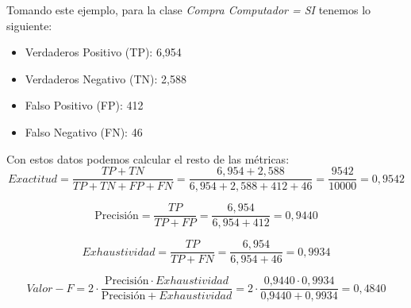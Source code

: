 Tomando este ejemplo, para la clase \textit{Compra Computador = SI} tenemos lo siguiente:

\begin{itemize}
	\item Verdaderos Positivo (TP): 6,954
	\item Verdaderos Negativo (TN): 2,588
	\item Falso Positivo (FP): 412
	\item Falso Negativo (FN): 46
\end{itemize}

Con estos datos podemos calcular el resto de las métricas:
\begin{equation*}
Exactitud = \frac{TP + TN}{TP + TN + FP + FN} = \frac{6,954 + 2,588}{6,954 + 2,588 + 412 + 46} = \frac{9542}{10000} = 0,9542
\end{equation*}

\begin{equation*}
\mbox{Precisión} = \frac{TP}{TP + FP} = \frac{6,954}{6,954 + 412} = 0,9440
\end{equation*}

\begin{equation*}
Exhaustividad = \frac{TP}{TP + FN} = \frac{6,954}{6,954 + 46} = 0,9934
\end{equation*}

\begin{equation*}
Valor-F = 2 \cdot \frac{\mbox{Precisión} \cdot Exhaustividad}{\mbox{Precisión} + Exhaustividad} 
		= 2 \cdot \frac{\mbox{0,9440} \cdot 0,9934}{\mbox{0,9440} + 0,9934}
		= 0,4840
\end{equation*}

